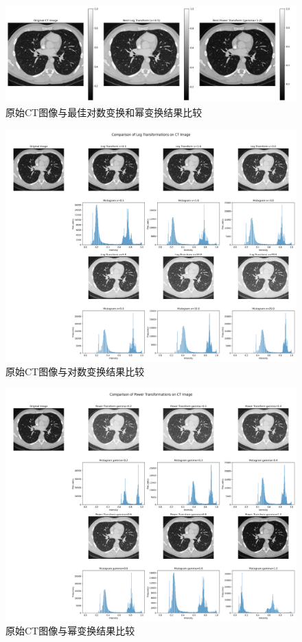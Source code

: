 \documentclass[10.5pt]{config}
\begin{document}
\begin{figure}[htbp]
    \centering
    \includegraphics[width=1.0\linewidth]{figures/CT_best_transformations.png}
    \caption{原始CT图像与最佳对数变换和幂变换结果比较}
    \label{fig:best_transforms}
\end{figure}
\begin{figure}[htbp]
    \centering
    \includegraphics[width=1.0\linewidth]{figures/CT_log_transforms_comparison.png}
    \caption{原始CT图像与对数变换结果比较}
    \label{fig:log_transforms_comparison}
\end{figure}\begin{figure}[htbp]
    \centering
    \includegraphics[width=1.0\linewidth]{figures/CT_power_transforms_comparison.png}
    \caption{原始CT图像与幂变换结果比较}
    \label{fig:power_transforms_comparison}
\end{figure}
\end{document}
